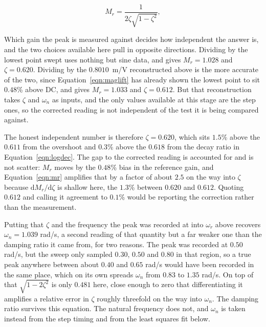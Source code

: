 \begin{equation}\label{eqn:mr}
    M_r = \frac{1}{2\zeta\sqrt{1-\zeta^2}},
\end{equation}

Which gain the peak is measured against decides how independent the answer is, and the two
choices available here pull in opposite directions. Dividing by the lowest point swept uses
nothing but sine data, and gives $M_r = 1.028$ and $\zeta = 0.620$. Dividing by the
$0.8010$~m/V reconstructed above is the more accurate of the two, since
Equation~\ref{eqn:maglift} has already shown the lowest point to sit $0.48$\% above DC, and
gives $M_r = 1.033$ and $\zeta = 0.612$. But that reconstruction takes $\zeta$ and
$\omega_n$ as inputs, and the only values available at this stage are the step ones, so the
corrected reading is not independent of the test it is being compared against.

The honest independent number is therefore $\zeta = 0.620$, which sits $1.5$\% above the
$0.611$ from the overshoot and $0.3$\% above the $0.618$ from the decay ratio in
Equation~\ref{eqn:logdec}. The gap to the corrected reading is accounted for and is not
scatter: $M_r$ moves by the $0.48$\% bias in the reference gain, and Equation~\ref{eqn:mr}
amplifies that by a factor of about $2.5$ on the way into $\zeta$ because
$\mathrm{d}M_r/\mathrm{d}\zeta$ is shallow here, the $1.3$\% between $0.620$ and $0.612$.
Quoting $0.612$ and calling it agreement to $0.1$\% would be reporting the correction rather
than the measurement.

Putting that $\zeta$ and the frequency the peak was recorded at into $\omega_r$ above recovers
$\omega_n = 1.039$ rad/s, a second reading of that quantity but a far weaker one than the
damping ratio it came from, for two reasons. The peak was recorded at $0.50$ rad/s, but the
sweep only sampled $0.30$, $0.50$ and $0.80$ in that region, so a true peak anywhere between
about $0.40$ and $0.65$ rad/s would have been recorded in the same place, which on its own
spreads $\omega_n$ from $0.83$ to $1.35$ rad/s. On top of that $\sqrt{1-2\zeta^2}$ is only
$0.481$ here, close enough to zero that differentiating it amplifies a relative error in
$\zeta$ roughly threefold on the way into $\omega_n$. The damping ratio survives this equation.
The natural frequency does not, and $\omega_n$ is taken instead from the step timing and from
the least squares fit below.

